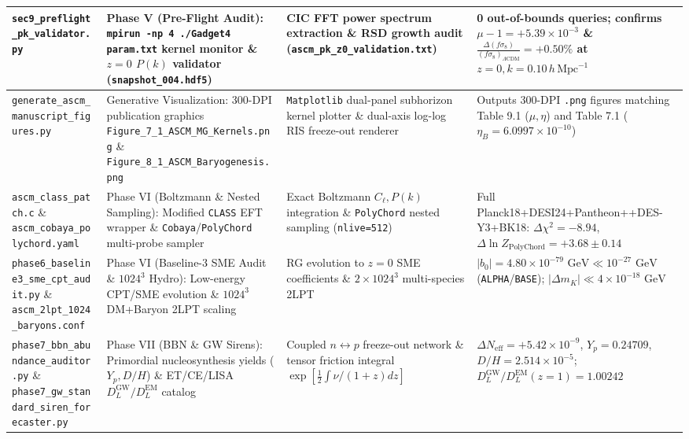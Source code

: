 \documentclass[aps,prd,onecolumn,superscriptaddress,nofootinbib,longbibliography,10pt]{revtex4-2}
\begin{document}
{{\begin{center}
\begin{tabular}{|llll|}
  \texttt{sec9_preflight_pk_validator.py} & Phase V (Pre-Flight Audit): \texttt{mpirun -np 4 ./Gadget4 param.txt} kernel monitor \& \(z=0\) \(P(k)\) validator (\texttt{snapshot_004.hdf5}) & CIC FFT power spectrum extraction \& RSD growth audit (\texttt{ascm_pk_z0_validation.txt}) & 0 out-of-bounds queries; confirms \(\mu - 1 = +5.39 \times 10^{-3}\) \& \(\frac{\Delta(f\sigma_8)}{(f\sigma_8)_{\Lambda\mathrm{CDM}}} = +0.50\%\) at \(z=0, k=0.10\,h\,\mathrm{Mpc}^{-1}\)
 \\ \hline


  \texttt{generate_ascm_manuscript_figures.py} & Generative Visualization: 300-DPI publication graphics \texttt{Figure_7_1_ASCM_MG_Kernels.png} \& \texttt{Figure_8_1_ASCM_Baryogenesis.png} & \texttt{Matplotlib} dual-panel subhorizon kernel plotter \& dual-axis log-log RIS freeze-out renderer & Outputs 300-DPI \texttt{.png} figures matching Table 9.1 (\(\mu, \eta\)) and Table 7.1 (\(\eta_B = 6.0997 \times 10^{-10}\))
 \\ \hline


  \texttt{ascm_class_patch.c} \& \texttt{ascm_cobaya_polychord.yaml} & Phase VI (Boltzmann \& Nested Sampling): Modified \texttt{CLASS} EFT wrapper \& \texttt{Cobaya}/\texttt{PolyChord} multi-probe sampler & Exact Boltzmann \(C_\ell, P(k)\) integration \& \texttt{PolyChord} nested sampling (\texttt{nlive=512}) & Full Planck18+DESI24+Pantheon++DES-Y3+BK18: \(\Delta\chi^2 = -8.94\), \(\Delta\ln Z_{\text{PolyChord}} = +3.68 \pm 0.14\)
 \\ \hline


  \texttt{phase6_baseline3_sme_cpt_audit.py} \& \texttt{ascm_2lpt_1024_baryons.conf} & Phase VI (Baseline-3 SME Audit \& \(1024^3\) Hydro): Low-energy CPT/SME evolution \& \(1024^3\) DM+Baryon 2LPT scaling & RG evolution to \(z=0\) SME coefficients \& \(2\times 1024^3\) multi-species 2LPT & \(|b_0| = 4.80 \times 10^{-79}\text{ GeV} \ll 10^{-27}\text{ GeV}\) (\texttt{ALPHA}/\texttt{BASE}); \(|\Delta m_K| \ll 4 \times 10^{-18}\text{ GeV}\)
 \\ \hline


  \texttt{phase7_bbn_abundance_auditor.py} \& \texttt{phase7_gw_standard_siren_forecaster.py} & Phase VII (BBN \& GW Sirens): Primordial nucleosynthesis yields (\(Y_p, D/H\)) \& ET/CE/LISA \(D_L^{\mathrm{GW}}/D_L^{\mathrm{EM}}\) catalog & Coupled \(n \leftrightarrow p\) freeze-out network \& tensor friction integral \(\exp[\frac{1}{2}\int \nu/(1+z)dz]\) & \(\Delta N_{\mathrm{eff}} = +5.42 \times 10^{-9}\), \(Y_p = 0.24709\), \(D/H = 2.514 \times 10^{-5}\); \(D_L^{\mathrm{GW}}/D_L^{\mathrm{EM}}(z=1) = 1.00242\)
 \\ \hline



\end{tabular}
\end{center}}}
\end{document}
